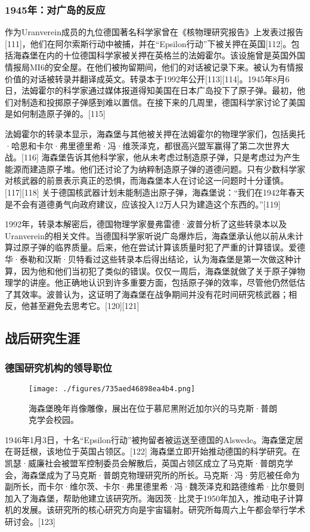 \subsubsection{1945年：对广岛的反应}  
作为Uranverein成员的九位德国著名科学家曾在《核物理研究报告》上发表过报告[111]，他们在阿尔索斯行动中被捕，并在“Epsilon行动”下被关押在英国[112]。包括海森堡在内的十位德国科学家被关押在英格兰的法姆霍尔。该设施曾是英国外国情报局MI6的安全屋。在他们被拘留期间，他们的对话被记录下来。被认为有情报价值的对话被转录并翻译成英文。转录本于1992年公开[113][114]。1945年8月6日，法姆霍尔的科学家通过媒体报道得知美国在日本广岛投下了原子弹。最初，他们对制造和投掷原子弹感到难以置信。在接下来的几周里，德国科学家讨论了美国是如何制造原子弹的。[115]

法姆霍尔的转录本显示，海森堡与其他被关押在法姆霍尔的物理学家们，包括奥托·哈恩和卡尔·弗里德里希·冯·维茨泽克，都很高兴盟军赢得了第二次世界大战。[116] 海森堡告诉其他科学家，他从未考虑过制造原子弹，只是考虑过为产生能源而建造原子堆。他们还讨论了为纳粹制造原子弹的道德问题。只有少数科学家对核武器的前景表示真正的恐惧，而海森堡本人在讨论这一问题时十分谨慎。[117][118] 关于德国核武器计划未能制造出原子弹，海森堡说：“我们在1942年春天是不会有道德勇气向政府建议，应该投入12万人只为建造这个东西的。”[119]

1992年，转录本解密后，德国物理学家曼弗雷德·波普分析了这些转录本以及Uranverein的相关文件。当德国科学家听说广岛爆炸后，海森堡承认他以前从未计算过原子弹的临界质量。后来，他在尝试计算该质量时犯了严重的计算错误。爱德华·泰勒和汉斯·贝特看过这些转录本后得出结论，认为海森堡是第一次做这种计算，因为他和他们当初犯了类似的错误。仅仅一周后，海森堡就做了关于原子弹物理学的讲座。他正确地认识到许多重要方面，包括原子弹的效率，尽管他仍然低估了其效率。波普认为，这证明了海森堡在战争期间并没有花时间研究核武器；相反，他甚至避免去思考它。[120][121]
\subsection{战后研究生涯}
\subsubsection{德国研究机构的领导职位} 
\begin{figure}[ht]
\centering
\texttt{[image: ./figures/735aed46898ea4b4.png]}
\caption{海森堡晚年肖像雕像，展出在位于慕尼黑附近加尔兴的马克斯·普朗克学会校园。} \label{fig_Heisen_3}
\end{figure} 
1946年1月3日，十名“Epsilon行动”被拘留者被运送至德国的Alswede。海森堡定居在哥廷根，该地位于英国占领区。[122] 海森堡立即开始推动德国的科学研究。在凯瑟·威廉社会被盟军控制委员会解散后，英国占领区成立了马克斯·普朗克学会，海森堡成为了马克斯·普朗克物理研究所的所长。马克斯·冯·劳厄被任命为副所长，而卡尔·维尔茨、卡尔·弗里德里希·冯·魏茨泽克和路德维希·比尔曼则加入了海森堡，帮助他建立该研究所。海因茨·比灵于1950年加入，推动电子计算机的发展。该研究所的核心研究方向是宇宙辐射。研究所每周六上午都会举行学术研讨会。[123]


